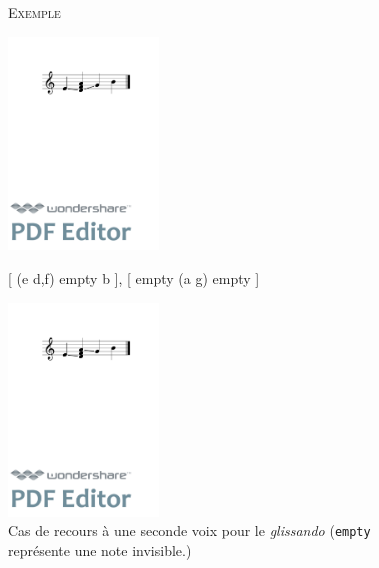 \documentclass{article}
\newenvironment{gmncode}	{\vspace{-2mm}\small\verbatim}{\endverbatim\vspace{-2mm}}
\newcommand{\code}[1]		{{\small \texttt{#1}}}
\newcommand{\exemple}		{\vspace{2mm}\hspace*{-3mm}\textsc{Exemple}}
\begin{document}
\begin{figure}[h]
\exemple
\begin{gmncode}
[ \glissando(e {d,f,a} g) b ]
\end{gmncode}
\begin{center}
\includegraphics[width=4cm]{img/glissandopb.pdf}
\end{center}
\begin{gmncode}
{ 
  [ \glissando(e {d,f}) empty b ],
  [  empty \glissando(a g) empty ] 
}
\end{gmncode}
\begin{center}
\includegraphics[width=4cm]{img/glissandosanspb.pdf}
\end{center}
\caption{Cas de recours à une seconde voix pour le \emph{glissando} (\code{empty} représente une note invisible.)}
\label{fig:glissandopb}
\end{figure}



\end{document}
